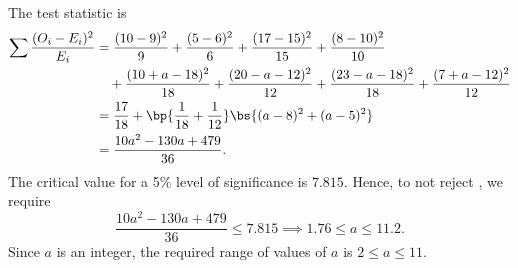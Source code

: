 \begin{solution}
\begin{ppart}
\begin{table}[H]
        \end{table}
        The test statistic is
        \begin{align*}
            \sum \frac{(O_i - E_i)^2}{E_i} &= \frac{(10-9)^2}{9} + \frac{(5-6)^2}{6} + \frac{(17-15)^2}{15} + \frac{(8-10)^2}{10}\\
            &\hspace{1em}+ \frac{(10+a-18)^2}{18} + \frac{(20-a-12)^2}{12} + \frac{(23-a-18)^2}{18} + \frac{(7+a-12)^2}{12}\\
            &= \frac{17}{18} + \bp{\frac1{18} + \frac1{12}}\bs{(a-8)^2 + (a-5)^2}\\
            &= \frac{10a^2 - 130a + 479}{36}.
        \end{align*}
        The critical value for a 5\% level of significance is $7.815$. Hence, to not reject \nullhyp, we require \[\frac{10a^2 - 130a + 479}{36} \leq 7.815 \implies 1.76 \leq a \leq 11.2.\] Since $a$ is an integer, the required range of values of $a$ is $2 \leq a \leq 11$.
    \end{ppart}
\end{solution}

